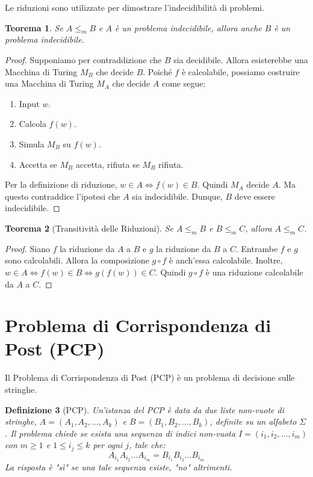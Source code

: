 \documentclass[a4paper, 11pt]{book} %
\newtheorem{theorem}{Teorema}[section]
\newtheorem{definition}[theorem]{Definizione}
\theoremstyle{definition}
\begin{document}
Le riduzioni sono utilizzate per dimostrare l'indecidibilità di problemi.
\begin{theorem}
Se $A \le_m B$ e $A$ è un problema indecidibile, allora anche $B$ è un problema indecidibile.
\end{theorem}
\begin{proof}
Supponiamo per contraddizione che $B$ sia decidibile. Allora esisterebbe una Macchina di Turing $M_B$ che decide $B$.
Poiché $f$ è calcolabile, possiamo costruire una Macchina di Turing $M_A$ che decide $A$ come segue:
\begin{enumerate}
    \item Input $w$.
    \item Calcola $f(w)$.
    \item Simula $M_B$ su $f(w)$.
    \item Accetta se $M_B$ accetta, rifiuta se $M_B$ rifiuta.
\end{enumerate}
Per la definizione di riduzione, $w \in A \iff f(w) \in B$. Quindi $M_A$ decide $A$. Ma questo contraddice l'ipotesi che $A$ sia indecidibile. Dunque, $B$ deve essere indecidibile.
\end{proof}

\begin{theorem}[Transitività delle Riduzioni]
Se $A \le_m B$ e $B \le_m C$, allora $A \le_m C$.
\end{theorem}
\begin{proof}
Siano $f$ la riduzione da $A$ a $B$ e $g$ la riduzione da $B$ a $C$.
Entrambe $f$ e $g$ sono calcolabili. Allora la composizione $g \circ f$ è anch'essa calcolabile.
Inoltre, $w \in A \iff f(w) \in B \iff g(f(w)) \in C$.
Quindi $g \circ f$ è una riduzione calcolabile da $A$ a $C$.
\end{proof}

\section{Problema di Corrispondenza di Post (PCP)}

Il Problema di Corrispondenza di Post (PCP) è un problema di decisione sulle stringhe.

\begin{definition}[PCP]
Un'istanza del PCP è data da due liste non-vuote di stringhe, $A = (A_1, A_2, \dots, A_k)$ e $B = (B_1, B_2, \dots, B_k)$, definite su un alfabeto $\Sigma$.
Il problema chiede se esista una sequenza di indici non-vuota $I = (i_1, i_2, \dots, i_m)$ con $m \ge 1$ e $1 \le i_j \le k$ per ogni $j$, tale che:
$$A_{i_1} A_{i_2} \dots A_{i_m} = B_{i_1} B_{i_2} \dots B_{i_m}$$
La risposta è "sì" se una tale sequenza esiste, "no" altrimenti.
\end{definition}
\end{document}
